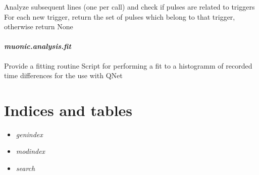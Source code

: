 \documentclass[letterpaper,10pt,english]{sphinxmanual}
\begin{document}
\begin{fulllineitems}

\begin{fulllineitems}
\label{muonic:muonic.analysis.PulseAnalyzer.PulseExtractor.extract}
Analyze subsequent lines (one per call)
and check if pulses are related to triggers
For each new trigger,
return the set of pulses which belong to that trigger,
otherwise return None

\end{fulllineitems}


\end{fulllineitems}



\subsubsection{\emph{muonic.analysis.fit}}
\label{muonic:muonic-analysis-fit}
Provide a fitting routine
\label{muonic:module-muonic.analysis.fit}
Script for performing a fit to a histogramm of recorded 
time differences for the use with QNet

\begin{fulllineitems}
\label{muonic:muonic.analysis.fit.main}
\end{fulllineitems}



\chapter{Indices and tables}
\label{index:indices-and-tables}\begin{itemize}
\item {} 
\emph{genindex}

\item {} 
\emph{modindex}

\item {} 
\emph{search}

\end{itemize}
\end{document}
